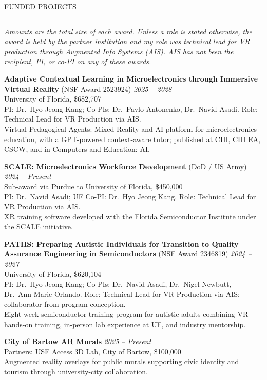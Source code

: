 \documentclass{resume} %
\renewenvironment{rSection}[1]{
  \needspace{4\baselineskip}
  \sectionskip
  \textcolor{CustomRed}{\MakeUppercase{#1}}
  \sectionlineskip
  \hrule
  \begin{list}{}{
    \setlength{\leftmargin}{1.5em}
  }
  \item[]
}{
  \end{list}
}
\begin{document}
\begin{rSection}{Funded Projects}
\emph{Amounts are the total size of each award. Unless a role is stated otherwise, the award is held by the partner institution and my role was technical lead for VR production through Augmented Info Systems (AIS). AIS has not been the recipient, PI, or co-PI on any of these awards.}

\vspace{0.4em}
\textbf{Adaptive Contextual Learning in Microelectronics through Immersive Virtual Reality} (NSF Award 2523924) \hfill \emph{2025 -- 2028}\\
University of Florida, \$682,707\\
PI: Dr.\ Hyo Jeong Kang; Co-PIs: Dr.\ Pavlo Antonenko, Dr.\ Navid Asadi. Role: Technical Lead for VR Production via AIS.\\
Virtual Pedagogical Agents: Mixed Reality and AI platform for microelectronics education, with a GPT-powered context-aware tutor; published at CHI, CHI EA, CSCW, and in Computers and Education: AI.

\textbf{SCALE: Microelectronics Workforce Development} (DoD / US Army) \hfill \emph{2024 -- Present}\\
Sub-award via Purdue to University of Florida, \$450,000\\
PI: Dr.\ Navid Asadi; UF Co-PI: Dr.\ Hyo Jeong Kang. Role: Technical Lead for VR Production via AIS.\\
XR training software developed with the Florida Semiconductor Institute under the SCALE initiative.

\textbf{PATHS: Preparing Autistic Individuals for Transition to Quality Assurance Engineering in Semiconductors} (NSF Award 2346819) \hfill \emph{2024 -- 2027}\\
University of Florida, \$620,104\\
PI: Dr.\ Hyo Jeong Kang; Co-PIs: Dr.\ Navid Asadi, Dr.\ Nigel Newbutt, Dr.\ Ann-Marie Orlando. Role: Technical Lead for VR Production via AIS; collaborator from program conception.\\
Eight-week semiconductor training program for autistic adults combining VR hands-on training, in-person lab experience at UF, and industry mentorship.

\textbf{City of Bartow AR Murals} \hfill \emph{2025 -- Present}\\
Partners: USF Access 3D Lab, City of Bartow, \$100,000\\
Augmented reality overlays for public murals supporting civic identity and tourism through university-city collaboration.


\end{rSection}
\end{document}
